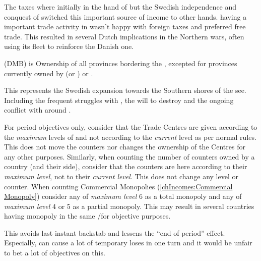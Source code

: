 \begin{histoire}
  The taxes where initially in the hand of \paysDanemark but the Swedish
  independence and conquest of \provinceSkane switched this important
  source of income to other hands. \HOL having a important trade
  activity in  wasn't happy with foreign taxes and
  preferred free trade. This resulted in several Dutch implications in
  the Northern wars, often using its fleet to reinforce the Danish one.
\end{histoire}

 (DMB) is Ownership of all
provinces bordering the , excepted for provinces
currently owned by  (or \PRU) or .

\begin{designnote}
  This represents the Swedish expansion towards the Southern shores of
  the see. Including the frequent struggles with \POL, the will to
  destroy \paysHanse and the ongoing conflict with \RUS around
  \provinceIngria.
\end{designnote}

For period objectives only, consider that the Trade Centres are given
according to the \emph{maximum} levels of \TradeFLEET and not according
to the \emph{current} level as per normal rules.
\bparag This does not move the counters nor changes the ownership of the
Centres for any other purposes.
\bparag Similarly, when counting the number of \TradeFLEET counters
owned by a country (and their side), consider that the counters are here
according to their \emph{maximum level}, not to their \emph{current
  level}. This does not change any \TradeFLEET level or counter.
\bparag When counting Commercial Monopolies (\ref{chIncomes:Commercial
  Monopoly}) consider any \TradeFLEET of \emph{maximum level} 6 as a
total monopoly and any \TradeFLEET of \emph{maximum level} 4 or 5 as a
partial monopoly. This may result in several countries having monopoly
in the same \CTZ/\STZ for objective purposes.

\begin{designnote}
  This avoids last instant backstab and lessens the ``end of period''
  effect. Especially, \corsaire can cause a lot of temporary loses in
  one turn and it would be unfair to bet a lot of objectives \VPs on
  this. 
\end{designnote}

